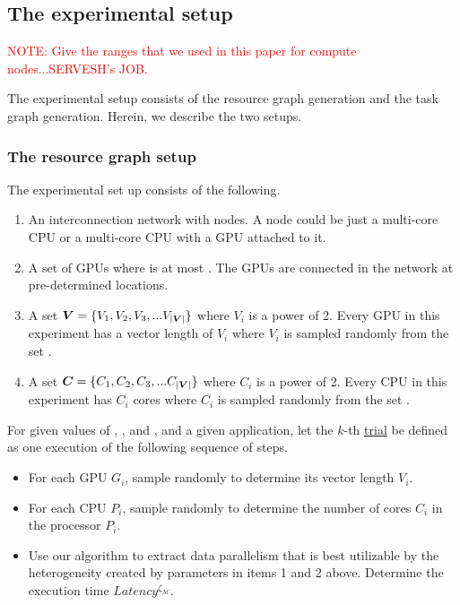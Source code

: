 \subsection{The experimental setup}
\label{sec:experimental-setup}

\textcolor{red}{NOTE: Give the ranges that we used in this paper for compute
nodes...SERVESH's JOB.}

The experimental setup consists of the resource graph generation and the
task graph generation. Herein, we describe the two setups.

\subsubsection{The resource graph setup}
\label{sec:resource-graph-setup}

The experimental set up consists of the following.

\begin{enumerate}

\item  An interconnection network with \numtplgynodes nodes. A node
could be just a multi-core CPU or a multi-core CPU with a GPU attached to it.

\item A set of \gpunum GPUs where \gpunum is at most \numtplgynodes. The GPUs
are connected in the network at pre-determined locations.

\item A set $\bm{V} = \{V_1, V_2, V_3, ... V_{|\bm{V}|}\}$ where $V_i$
is a power of 2.  Every GPU in this experiment has a vector length of $V_i$
where $V_i$ is sampled randomly from the set \veclenset.

\item A set $\bm{C} = \{C_1, C_2, C_3, ... C_{|\bm{V}|}\}$ where $C_i$
is a power of 2.  Every CPU in this experiment has $C_i$
cores where $C_i$ is sampled randomly from the set \corenumset.

\end{enumerate}

For given values of \numtplgynodes, \gpunum, \veclenset and \corenumset,
and a given application, let the $k$-th \ul{trial} be defined as one
execution of the following sequence of steps.

\begin{itemize}

\item For each GPU $G_i$, sample \veclenset
randomly to determine its vector length $V_i$. \label{i1}

\item For each CPU $P_i$, sample \corenumset randomly to determine the
  number of cores $C_i$ in the processor $P_i$.~\label{i2}

\item Use our algorithm to extract data parallelism that is best
  utilizable by the heterogeneity created by parameters in items 1 and 2
  above. Determine the execution time $Latency^{\zeta_\mathcal{M}}$.

\end{itemize}



